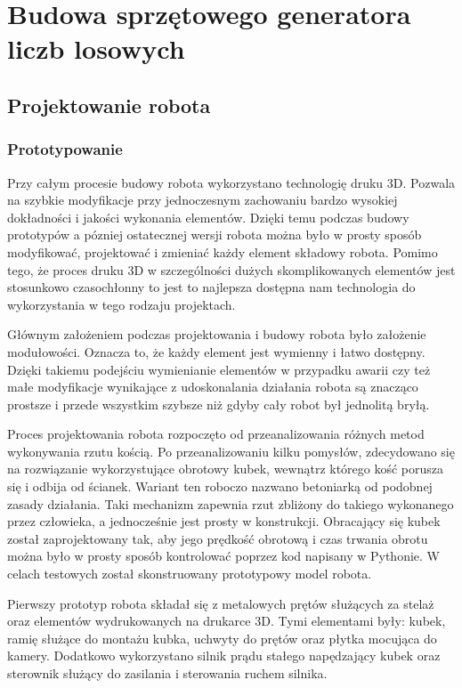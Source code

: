 
\chapter{Budowa sprzętowego generatora liczb losowych}
\section{Projektowanie robota}
\subsection{Prototypowanie}

Przy całym procesie budowy robota wykorzystano technologię druku 3D. Pozwala na szybkie modyfikacje przy 
jednoczesnym zachowaniu bardzo wysokiej dokładności i jakości wykonania elementów. Dzięki temu podczas budowy prototypów a 
pózniej ostatecznej wersji robota można było w prosty sposób modyfikować, projektować i zmieniać każdy element składowy 
robota. Pomimo tego, że proces druku 3D w szczególności dużych skomplikowanych elementów jest stosunkowo czasochłonny to jest to
najlepsza dostępna nam technologia do wykorzystania w tego rodzaju projektach.

Głównym założeniem podczas projektowania i budowy robota było założenie modułowości. Oznacza to, że każdy element jest wymienny i łatwo dostępny.
Dzięki takiemu podejściu wymienianie elementów w przypadku awarii czy też małe modyfikacje wynikające z udoskonalania działania robota
są znacząco prostsze i przede wszystkim szybsze niż gdyby cały robot był jednolitą bryłą.

Proces projektowania robota rozpoczęto od przeanalizowania różnych metod wykonywania rzutu kością.
Po przeanalizowaniu kilku pomysłów, zdecydowano się na rozwiązanie wykorzystujące obrotowy 
kubek, wewnątrz którego kość porusza się i odbija od ścianek. Wariant ten roboczo nazwano betoniarką od podobnej 
zasady działania. Taki mechanizm zapewnia rzut zbliżony do takiego wykonanego przez człowieka, a 
jednocześnie jest prosty w konstrukcji. Obracający się kubek został 
zaprojektowany tak, aby jego prędkość obrotową i czas trwania obrotu można było w prosty sposób kontrolować poprzez kod napisany w Pythonie.
W celach testowych został skonstruowany prototypowy model robota.

Pierwszy prototyp robota składał się z metalowych prętów służących za stelaż oraz elementów wydrukowanych na drukarce 3D.
Tymi elementami były: kubek, ramię służące do montażu kubka, uchwyty do prętów oraz płytka mocująca do kamery. Dodatkowo
wykorzystano silnik prądu stałego napędzający kubek oraz sterownik służący do zasilania i sterowania ruchem silnika.

